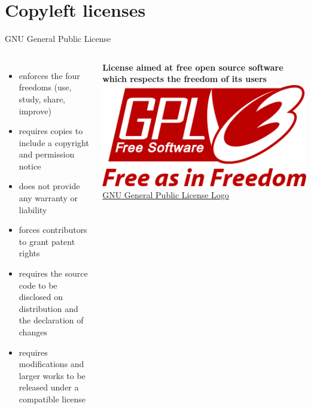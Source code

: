 \documentclass[10pt, graphics, aspectratio=169, table]{beamer}
\begin{document}
    \section{Copyleft licenses}
    \begin{frame}{GNU General Public License}
        \begin{columns}
                \begin{itemize}
                    \item enforces the four freedoms (use, study, share, improve)
                    \item requires copies to include a copyright and permission notice
                    \item does not provide any warranty or liability
                    \item forces contributors to grant patent rights
                    \item requires the source code to be disclosed on distribution and the declaration of changes
                    \item requires modifications and larger works to be released under a compatible license
                \end{itemize}
                \textbf{License aimed at free open source software which respects the freedom of its users}
                \includegraphics[width=\textwidth]{img/GPL.png}
                \center\tiny\href{https://commons.wikimedia.org/wiki/File:GPLv3_Logo.svg}{GNU General Public License Logo}
        \end{columns}
    \end{frame}
\end{document}
